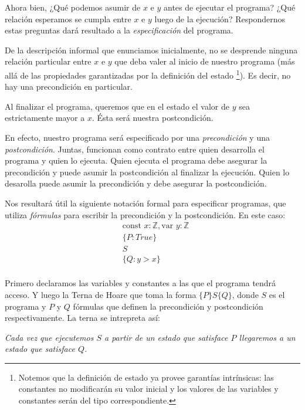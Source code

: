 \documentclass[12pt, a4paper, openany, fleqn]{book}
\newcommand{\declConst}[2]{\text{const } #1 : #2}
\newcommand{\declVar}[2]{\text{var } #1 : #2}
\begin{document}
    Ahora bien, ¿Qué podemos asumir de $x$ e $y$ antes de ejecutar el programa? ¿Qué relación esperamos se cumpla entre $x$ e $y$ luego de la ejecución? Respondernos estas preguntas dará resultado a la \textit{especificación} del programa.

    De la descripción informal que enunciamos inicialmente, no se desprende ninguna relación particular entre $x$ e $y$ que deba valer al inicio de nuestro programa (más allá de las propiedades garantizadas por la definición del estado \footnote{Notemos que la definición de estado ya provee garantías intrínsicas: las constantes no modificarán su valor inicial y los valores de las variables y constantes serán del tipo correspondiente.}). Es decir, no hay una precondición en particular.

    Al finalizar el programa, queremos que en el estado el valor de $y$ sea estrictamente mayor a $x$. Ésta será nuestra postcondición.

    En efecto, nuestro programa será especificado por una \textit{precondición} y una \textit{postcondición}. Juntas, funcionan como contrato entre quien desarrolla el programa y quien lo ejecuta. Quien ejecuta el programa debe asegurar la precondición y puede asumir la postcondición al finalizar la ejecución. Quien lo desarolla puede asumir la precondición y debe asegurar la postcondición.

    Nos resultará útil la siguiente notación formal para especificar programas, que utiliza \textit{fórmulas} para escribir la precondición y la postcondición. En este caso:
    \begin{align*}
        & \declConst{x}{\mathbb{Z}}, \declVar{y}{\mathbb{Z}}\\
        & \{P: True\} \\
        & S \\
        & \{Q: y > x\}\\
    \end{align*}

    Primero declaramos las variables y constantes a las que el programa tendrá acceso. Y luego la Terna de Hoare que toma la forma $\{P\}S\{Q\}$, donde $S$ es el programa y $P$ y $Q$ fórmulas que definen la precondición y postcondición respectivamente. La terna se intrepreta así: 
    \begin{center}
        \textit{Cada vez que ejecutemos $S$ a partir de un estado que satisface $P$ llegaremos a un estado que satisface $Q$.}
    \end{center}
    
\end{document}
